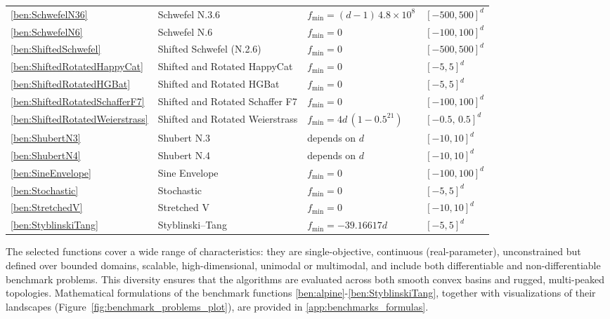 {\begin{longtable}[c]{p{0.8cm}p{6.4cm}ll}
\eqref{ben:SchwefelN36} & Schwefel N.3.6 & $f_{\min} = (d\!-\!1)\,4.8\times10^8$ & $[-500,500]^d$ \\
\eqref{ben:SchwefelN6} & Schwefel N.6 & $f_{\min}=0$ & $[-100,100]^d$ \\
\eqref{ben:ShiftedSchwefel} & Shifted Schwefel (N.2.6)  & $f_{\min}=0$ & $[-500,500]^d$ \\
\eqref{ben:ShiftedRotatedHappyCat} & Shifted and Rotated HappyCat & $f_{\min} = 0$ & $[-5,5]^d$ \\
\eqref{ben:ShiftedRotatedHGBat} & Shifted and Rotated HGBat & $f_{\min} = 0$ & $[-5,5]^d$ \\
\eqref{ben:ShiftedRotatedSchafferF7} & Shifted and Rotated Schaffer F7 & $f_{\min}=0$ & $[-100,100]^d$ \\
\eqref{ben:ShiftedRotatedWeierstrass} & Shifted and Rotated Weierstrass & $f_{\min} = 4d\,(1\!-\!0.5^{21})$ & $[-0.5,\,0.5]^d$ \\
\eqref{ben:ShubertN3} & Shubert N.3 & depends on $d$ & $[-10,10]^d$ \\
\eqref{ben:ShubertN4} & Shubert N.4 & depends on $d$ & $[-10,10]^d$ \\
\eqref{ben:SineEnvelope} & Sine Envelope & $f_{\min} = 0$ & $[-100,100]^d$ \\
\eqref{ben:Stochastic} & Stochastic & $f_{\min} = 0$ & $[-5,5]^d$ \\
\eqref{ben:StretchedV} & Stretched V & $f_{\min} = 0$ & $[-10,10]^d$ \\
\eqref{ben:StyblinskiTang} & Styblinski–Tang & $f_{\min} = -39.16617d$ & $[-5,5]^d$ \\
\end{longtable}

The selected functions cover a wide range of characteristics: they are single-objective, continuous (real-parameter), unconstrained but defined over bounded domains, scalable, high-dimensional, unimodal or multimodal, and include both differentiable and non-differentiable benchmark problems. This diversity ensures that the algorithms are evaluated across both smooth convex basins and rugged, multi-peaked topologies. Mathematical formulations of the benchmark functions \eqref{ben:alpine}-\eqref{ben:StyblinskiTang}, together with visualizations of their landscapes (Figure~\ref{fig:benchmark_problems_plot}), are provided in \autoref{app:benchmarks_formulas}.



}
